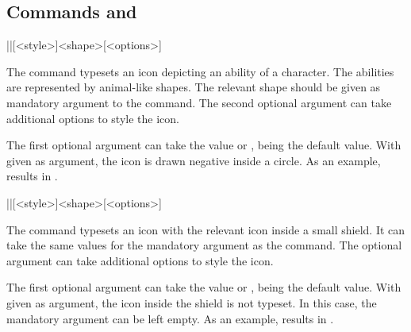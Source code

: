 \documentclass[a4paper]{article}
\begin{document}
\subsection[Commands \textbackslash ability and \textbackslash saving]{Commands  and }

\begin{macrodef}
|\ability|[<style>]{<shape>}[<options>]
\end{macrodef}
The command \macro{\ability} typesets an icon depicting an ability of a character. The abilities are represented by animal-like shapes. The relevant shape should be given as mandatory argument to the command. The second optional argument can take additional options to style the icon.

The first optional argument can take the value  or ,  being the default value. With  given as argument, the icon is drawn negative inside a circle. As an example,  results in .

\begin{macrodef}
|\saving|[<style>]{<shape>}[<options>]
\end{macrodef}
The command \macro{\saving} typesets an icon with the relevant \macro{\ability} icon inside a small shield. It can take the same values for the mandatory argument as the \macro{\ability} command. The optional argument can take additional options to style the icon.

The first optional argument can take the value  or ,  being the default value. With  given as argument, the icon inside the shield is not typeset. In this case, the mandatory argument can be left empty. As an example, \macro{\saving[empty]{}} results in \saving[empty]{}.
\end{document}
